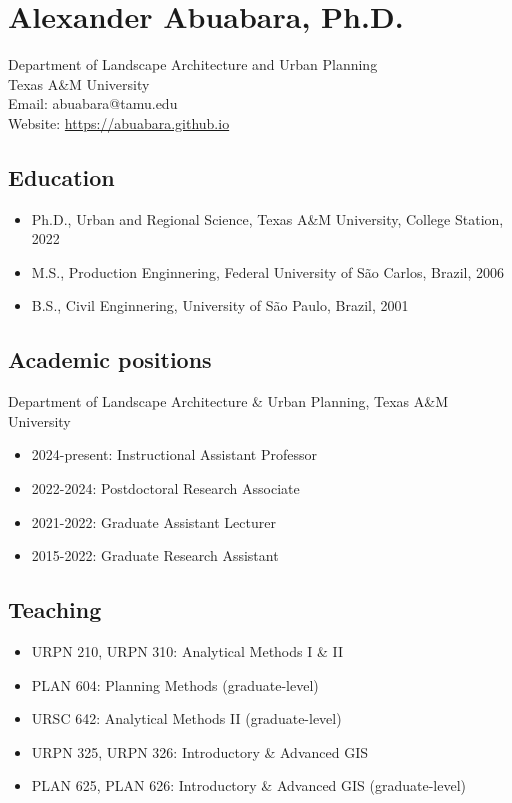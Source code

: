 \documentclass[article,8pt]{article}
\date{\today}
\title{}
\begin{document}
\section*{Alexander Abuabara, Ph.D.}

Department of Landscape Architecture and Urban Planning\\[1pt]
Texas A\&M University\\[1pt]
Email: abuabara@tamu.edu\\[1pt]
Website: \url{https://abuabara.github.io}

\subsection*{Education}
\begin{itemize}
\item Ph.D., Urban and Regional Science, Texas A\&M University, College Station, 2022
\item M.S., Production Enginnering, Federal University of São Carlos, Brazil, 2006
\item B.S., Civil Enginnering, University of São Paulo, Brazil, 2001
\end{itemize}

\subsection*{Academic positions}
Department of Landscape Architecture \& Urban Planning, Texas A\&M University
\begin{itemize}
\item 2024-present: Instructional Assistant Professor
\item 2022-2024: Postdoctoral Research Associate
\item 2021-2022: Graduate Assistant Lecturer
\item 2015-2022: Graduate Research Assistant
\end{itemize}

\subsection*{Teaching}
\begin{itemize}
\item URPN 210, URPN 310: Analytical Methods I \& II
\item PLAN 604: Planning Methods (graduate-level)
\item URSC 642: Analytical Methods II (graduate-level)
\item URPN 325, URPN 326: Introductory \& Advanced GIS
\item PLAN 625, PLAN 626: Introductory \& Advanced GIS (graduate-level)
\end{itemize}
\end{document}
